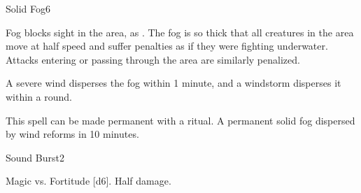 \begin{spellsection}{Solid Fog}{6}
    \begin{spellheader}
    \end{spellheader}
    \begin{spellcontent}
        \begin{spelltargetinginfo}
        \end{spelltargetinginfo}
        \begin{spelleffects}
            \spelleffect Fog blocks sight in the area, as . The fog is so thick that all creatures in the area move at half speed and suffer penalties as if they were fighting underwater. Attacks entering or passing through the area are similarly penalized.
            \spelldur \durshort
        \end{spelleffects}
    \end{spellcontent}
    \begin{spellfooter}
        \spellnotes \fogspellnotes A severe wind disperses the fog within 1 minute, and a windstorm disperses it within a round.

        \physicalspellnotes

        This spell can be made permanent with a  ritual. A permanent solid fog dispersed by wind reforms in 10 minutes.
        \miscastyou
    \end{spellfooter}
\end{spellsection}

\begin{spellsection}{Sound Burst}{2}
    \begin{spellheader}
    \end{spellheader}
    \begin{spellcontent}
        \begin{spelltargetinginfo}
        \end{spelltargetinginfo}
        \begin{spelleffects}
            \begin{spellattack}{Magic vs. Fortitude}
                \spellsuccess {}[d6].
                \spellfailure Half damage.
            \end{spellattack}
        \end{spelleffects}
    \end{spellcontent}
    \begin{spellfooter}
        \miscastyou
    \end{spellfooter}
\end{spellsection}


